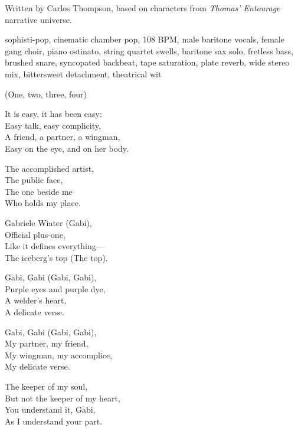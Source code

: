 
\label{sec:delicate-verse}
\begin{notes}
Written by Carlos Thompson, based on characters from \emph{Thomas’ Entourage} narrative universe.
\end{notes}
\begin{style}
sophisti-pop, cinematic chamber pop, 108 BPM, male baritone vocals, female gang choir, piano ostinato, string quartet swells, baritone sax solo, fretless bass, brushed snare, syncopated backbeat, tape saturation, plate reverb, wide stereo mix, bittersweet detachment, theatrical wit
\end{style}
\begin{lyrics}
(One, two, three, four)

It is easy, it has been easy:\\
Easy talk, easy complicity,\\
A friend, a partner, a wingman,\\
Easy on the eye, and on her body.

The accomplished artist,\\
The public face,\\
The one beside me\\
Who holds my place.

Gabriele Wiater (Gabi),\\
Official plus-one,\\
Like it defines everything—\\
The iceberg's top
(The top).

Gabi, Gabi (Gabi, Gabi),\\
Purple eyes and purple dye,\\
A welder's heart,\\
A delicate verse.

Gabi, Gabi (Gabi, Gabi),\\
My partner, my friend,\\
My wingman, my accomplice,\\
My delicate verse.

The keeper of my soul,\\
But not the keeper of my heart,\\
You understand it, Gabi,\\
As I understand your part.


\end{lyrics}
